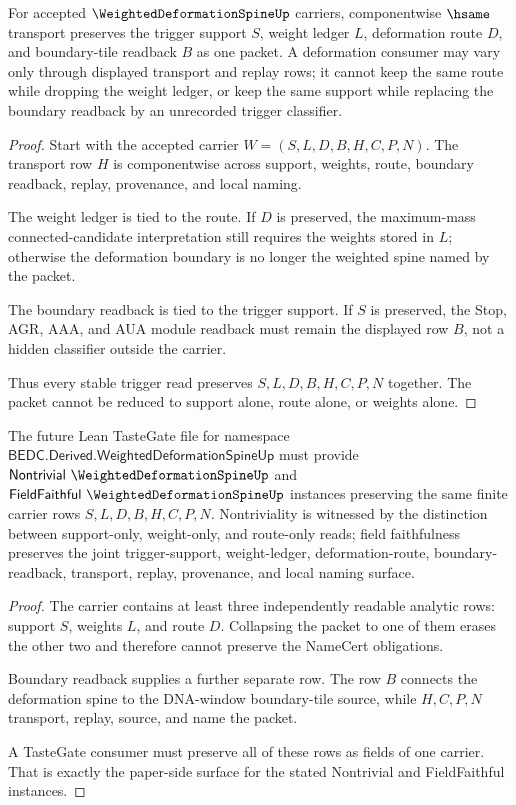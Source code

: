 \begin{theorem}
\label{thm:weighted-deformation-spine-trigger-stability}
For accepted $\WeightedDeformationSpineUp$ carriers, componentwise $\hsame$ transport preserves the trigger support $S$, weight ledger $L$, deformation route $D$, and boundary-tile readback $B$ as one packet. A deformation consumer may vary only through displayed transport and replay rows; it cannot keep the same route while dropping the weight ledger, or keep the same support while replacing the boundary readback by an unrecorded trigger classifier.
\end{theorem}
\begin{proof}
Start with the accepted carrier $W=(S,L,D,B,H,C,P,N)$. The transport row $H$ is componentwise across support, weights, route, boundary readback, replay, provenance, and local naming.

The weight ledger is tied to the route. If $D$ is preserved, the maximum-mass connected-candidate interpretation still requires the weights stored in $L$; otherwise the deformation boundary is no longer the weighted spine named by the packet.

The boundary readback is tied to the trigger support. If $S$ is preserved, the Stop, AGR, AAA, and AUA module readback must remain the displayed row $B$, not a hidden classifier outside the carrier.

Thus every stable trigger read preserves $S,L,D,B,H,C,P,N$ together. The packet cannot be reduced to support alone, route alone, or weights alone.
\end{proof}

\begin{theorem}
\label{thm:weighted-deformation-spine-tastegate-surface}
The future Lean TasteGate file for namespace $\mathsf{BEDC.Derived.WeightedDeformationSpineUp}$ must provide $\mathsf{Nontrivial}\ \WeightedDeformationSpineUp$ and $\mathsf{FieldFaithful}\ \WeightedDeformationSpineUp$ instances preserving the same finite carrier rows $S,L,D,B,H,C,P,N$. Nontriviality is witnessed by the distinction between support-only, weight-only, and route-only reads; field faithfulness preserves the joint trigger-support, weight-ledger, deformation-route, boundary-readback, transport, replay, provenance, and local naming surface.
\end{theorem}
\begin{proof}
The carrier contains at least three independently readable analytic rows: support $S$, weights $L$, and route $D$. Collapsing the packet to one of them erases the other two and therefore cannot preserve the NameCert obligations.

Boundary readback supplies a further separate row. The row $B$ connects the deformation spine to the DNA-window boundary-tile source, while $H,C,P,N$ transport, replay, source, and name the packet.

A TasteGate consumer must preserve all of these rows as fields of one carrier. That is exactly the paper-side surface for the stated Nontrivial and FieldFaithful instances.
\end{proof}

